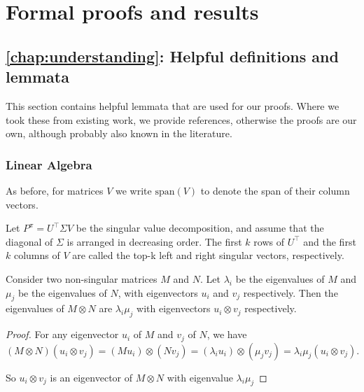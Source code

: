 \chapter{Formal proofs and results}
\label{app:proofs}

\section{\autoref{chap:understanding}: Helpful definitions and lemmata}

\label{app:formal:understanding}

This section contains helpful lemmata that are used for our proofs.
Where we took these from existing work, we provide references, otherwise the proofs are our own, although probably also known in the literature.

\subsection{Linear Algebra}
\label{app:formal:understanding:linalg}

As before, for matrices $V$ we write $\mathrm{span}(V)$ to denote the span of their column vectors. 

\begin{definition}\label{def:understanding:topk-single}
Let $P^\pi = U^\top \Sigma V$ be the singular value decomposition, and assume that the diagonal of $\Sigma$ is arranged in decreasing order.
The first $k$ rows of $U^\top$ and the first $k$ columns of $V$ are called the top-k left and right singular vectors, respectively.
\end{definition}

\begin{lemma}\label{lem:understanding:spectrum_kronecker}
    Consider two non-singular matrices $M$ and $N$. Let $\lambda_i$ be the eigenvalues of $M$ and $\mu_j$ be the eigenvalues of $N$, with eigenvectors $u_i$ and $v_j$ respectively. Then the eigenvalues of $M\otimes N$ are $\lambda_i\mu_j$ with eigenvectors $u_i \otimes v_j$ respectively.
\end{lemma}

\begin{proof}
For any eigenvector $u_i$ of $M$ and $v_j$ of $N$, we have
    $$\left(M\otimes N\right) \left(u_i \otimes v_j\right) = \left(M u_i\right) \otimes \left(N v_j\right) = \left(\lambda_i u_i\right)\otimes\left(\mu_j v_j\right) = \lambda_i\mu_j \left(u_i \otimes v_j\right).$$

    So $u_i\otimes v_j$ is an eigenvector of $M\otimes N$ with eigenvalue $\lambda_i \mu_j$
\end{proof}

